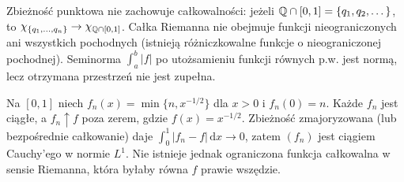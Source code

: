 \begin{uwaga}
Zbieżność punktowa nie zachowuje całkowalności: jeżeli $\mathbb Q\cap[0,1]=\{q_1,q_2,\dots\}$, to $\chi_{\{q_1,\dots,q_n\}}\to\chi_{\mathbb Q\cap[0,1]}$. Całka Riemanna nie obejmuje funkcji nieograniczonych ani wszystkich pochodnych (istnieją różniczkowalne funkcje o nieograniczonej pochodnej). Seminorma $\int_a^b|f|$ po utożsamieniu funkcji równych p.w. jest normą, lecz otrzymana przestrzeń nie jest zupełna.
\end{uwaga}
\begin{przyklad}
Na $[0,1]$ niech $f_n(x)=\min\{n,x^{-1/2}\}$ dla $x>0$ i $f_n(0)=n$. Każde $f_n$ jest ciągłe, a $f_n\uparrow f$ poza zerem, gdzie $f(x)=x^{-1/2}$. Zbieżność zmajoryzowana (lub bezpośrednie całkowanie) daje $\int_0^1|f_n-f|\,\mathrm dx\to0$, zatem $(f_n)$ jest ciągiem Cauchy'ego w normie $L^1$. Nie istnieje jednak ograniczona funkcja całkowalna w sensie Riemanna, która byłaby równa $f$ prawie wszędzie.
\end{przyklad}

